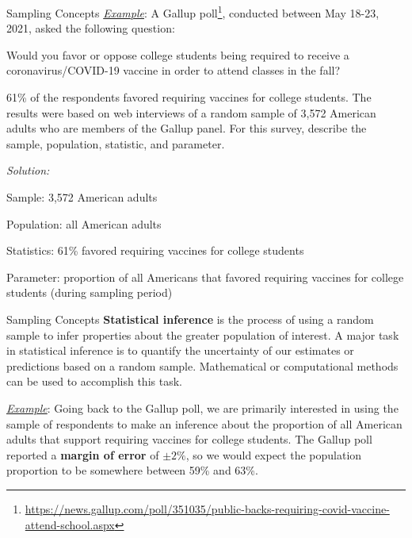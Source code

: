 \documentclass[10pt]{beamer}
\begin{document}
\begin{frame}{Sampling Concepts}
\emph{\underline{Example}}: A Gallup poll\footnote{\tiny \url{https://news.gallup.com/poll/351035/public-backs-requiring-covid-vaccine-attend-school.aspx}}, conducted between May 18-23, 2021, asked the following question: 

\smallskip
Would you favor or oppose college students being required to receive a coronavirus/COVID-19 vaccine in order to attend classes in the fall?
\medskip

61\% of the respondents favored requiring vaccines for college students.  The results were based on web interviews of a random sample of 3,572 American adults who are members of the Gallup panel.  For this survey, describe the sample, population, statistic, and parameter.\\
\vspace{10pt}

{\color{blue}\emph{Solution:}}
\begin{enumerate}
{\color{blue}
\item Sample: 3,572 American adults
\item Population: all American adults
\item Statistics: 61\% favored requiring vaccines for college students
\item Parameter: proportion of all Americans that favored requiring vaccines for college students (during sampling period)}
\end{enumerate}
\end{frame}

\begin{frame}{Sampling Concepts}
\textbf{Statistical inference} is the process of using a random sample to infer properties about the greater population of interest.  A major task in statistical inference is to quantify the uncertainty of our estimates or predictions based on a random sample.  Mathematical or computational methods can be used to accomplish this task.\\
\vspace{15pt}

\emph{\underline{Example}}:  Going back to the Gallup poll, we are primarily interested in using the sample of respondents to make an inference about the proportion of all American adults that support requiring vaccines for college students.  The Gallup poll reported a \textbf{margin of error} of $\pm 2\%$, so we would expect the population proportion to be somewhere between 59\% and 63\%.  
\end{frame}
\end{document}
